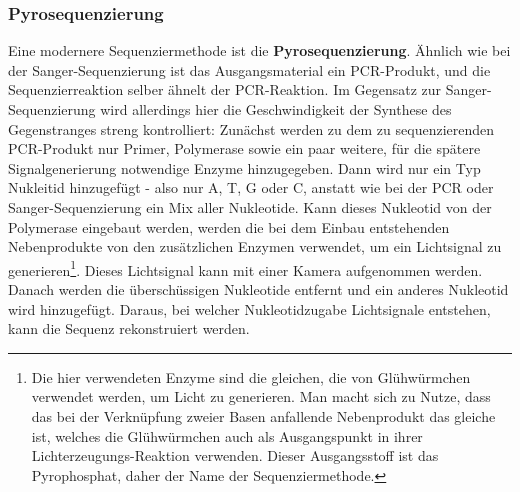 \subsubsection{Pyrosequenzierung}

Eine modernere Sequenziermethode ist die \textbf{Pyrosequenzierung}. Ähnlich wie bei der Sanger-Sequenzierung ist das Ausgangsmaterial ein PCR-Produkt, und die Sequenzierreaktion selber ähnelt der PCR-Reaktion. Im Gegensatz zur Sanger-Sequenzierung wird allerdings hier die Geschwindigkeit der Synthese des Gegenstranges streng kontrolliert: Zunächst werden zu dem zu sequenzierenden PCR-Produkt nur Primer, Polymerase sowie ein paar weitere, für die spätere Signalgenerierung notwendige Enzyme hinzugegeben. Dann wird nur ein Typ Nukleitid hinzugefügt - also nur A, T, G oder C, anstatt wie bei der PCR oder Sanger-Sequenzierung ein Mix aller Nukleotide. Kann dieses Nukleotid von der Polymerase eingebaut werden, werden die bei dem Einbau entstehenden Nebenprodukte von den zusätzlichen Enzymen verwendet, um ein Lichtsignal zu generieren\footnote{Die hier verwendeten Enzyme sind die gleichen, die von Glühwürmchen verwendet werden, um Licht zu generieren. Man macht sich zu Nutze, dass das bei der Verknüpfung zweier Basen anfallende Nebenprodukt das gleiche ist, welches die Glühwürmchen auch als Ausgangspunkt in ihrer Lichterzeugungs-Reaktion verwenden. Dieser Ausgangsstoff ist das Pyrophosphat, daher der Name der Sequenziermethode.}. Dieses Lichtsignal kann mit einer Kamera aufgenommen werden. Danach werden die überschüssigen Nukleotide entfernt und ein anderes Nukleotid wird hinzugefügt. Daraus, bei welcher Nukleotidzugabe Lichtsignale entstehen, kann die Sequenz rekonstruiert werden.
